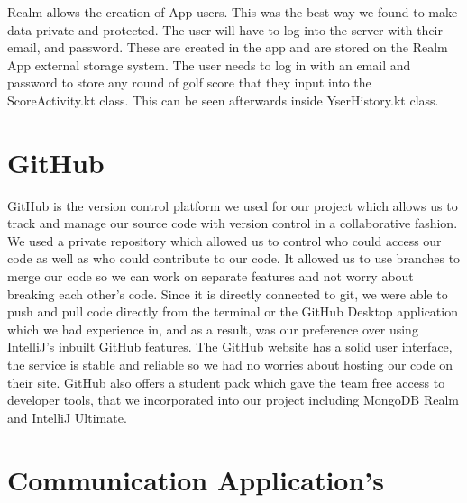 Realm allows the creation of App users. This was the best way we found to make data private and protected. The user will have to log into the server with their email, and password. These are created in the app and are stored on the Realm App external storage system.
The user needs to log in with an email and password to store any round of golf score that they input into the ScoreActivity.kt class. This can be seen afterwards inside YserHistory.kt class.

\section{GitHub}
GitHub is the version control platform we used for our project which allows us to track and manage our source code with version control in a collaborative fashion. We used a private repository which allowed us to control who could access our code as well as who could contribute to our code. It allowed us to use branches to merge our code so we can work on separate features and not worry about breaking each other's code. 
\newline \newline
Since it is directly connected to git, we were able to push and pull code directly from the terminal or the GitHub Desktop application which we had experience in, and as a result, was our preference over using IntelliJ's inbuilt GitHub features. The GitHub website has a solid user interface, the service is stable and reliable so we had no worries about hosting our code on their site. GitHub also offers a student pack which gave the team free access to developer tools, that we incorporated into our project including MongoDB Realm and IntelliJ Ultimate.
\section{Communication Application's}
